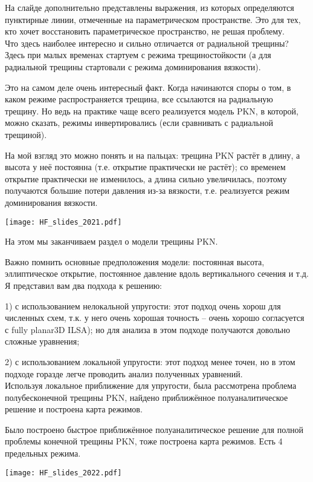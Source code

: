 \documentclass[main.tex]{subfiles}
\begin{document}
На слайде дополнительно представлены выражения, из которых определяются пунктирные линии, отмеченные на параметрическом пространстве.
Это для тех, кто хочет восстановить параметрическое пространство, не решая проблему.
\\

Что здесь наиболее интересно и сильно отличается от радиальной трещины?
Здесь при малых временах стартуем с режима трещиностойкости (а для радиальной трещины стартовали с режима доминирования вязкости).

Это на самом деле очень интересный факт.
Когда начинаются споры о том, в каком режиме распространяется трещина, все ссылаются на радиальную трещину.
Но ведь на практике чаще всего реализуется модель PKN, в которой, можно сказать, режимы инвертировались (если сравнивать с радиальной трещиной).

На мой взгляд это можно понять и на пальцах: трещина PKN растёт в длину, а высота у неё постоянна (т.е. открытие практически не растёт); со временем открытие практически не изменилось, а длина сильно увеличилась, поэтому получаются большие потери давления из-за вязкости, т.е. реализуется режим доминирования вязкости.

\texttt{[image: HF\_slides\_2021.pdf]}

На этом мы заканчиваем раздел о модели трещины PKN.

Важно помнить основные предположения модели: постоянная высота, эллиптическое открытие, постоянное давление вдоль вертикального сечения и т.д.
\\

Я представил вам два подхода к решению:

1) с использованием нелокальной упругости: этот подход очень хорош для численных схем, т.к. у него очень хорошая точность -- очень хорошо согласуется с fully planar3D ILSA); но для анализа в этом подходе получаются довольно сложные уравнения;

2) с использованием локальной упругости: этот подход менее точен, но в этом подходе горазде легче проводить анализ полученных уравнений.
\\

Используя локальное приближение для упругости, была рассмотрена проблема полубесконечной трещины PKN, найдено приближённое полуаналитическое решение и построена карта режимов.

Было построено быстрое приближённое полуаналитическое решение для полной проблемы конечной трещины PKN, тоже построена карта режимов.
Есть 4 предельных режима.

\texttt{[image: HF\_slides\_2022.pdf]}
\end{document}
